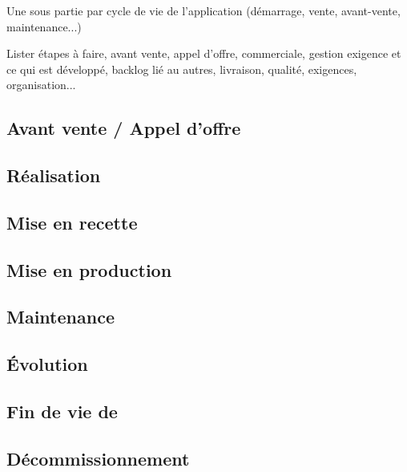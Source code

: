 

Une sous partie par cycle de vie de l'application (démarrage, vente, avant-vente, maintenance...)

Lister étapes à faire, avant vente, appel d'offre, commerciale, gestion exigence et ce qui est développé, backlog lié au autres, livraison, qualité, exigences, organisation...


\subsection{Avant vente / Appel d'offre}

\subsection{Réalisation}

\subsection{Mise en recette}

\subsection{Mise en production}

\subsection{Maintenance}

\subsection{Évolution}

\subsection{Fin de vie de}

\subsection{Décommissionnement}


